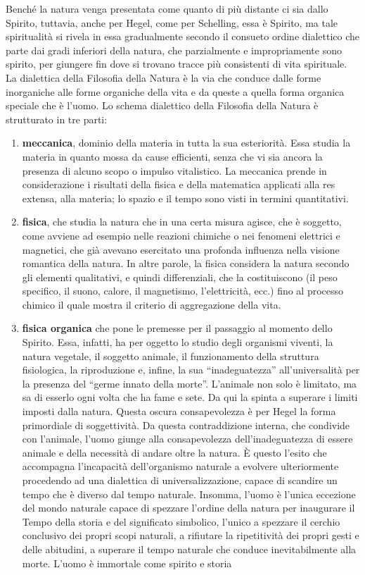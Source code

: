 \documentclass[a4paper,12pt,oneside,openany]{book}%
\begin{document}
Benché la natura venga presentata come quanto di più distante ci sia dallo Spirito, tuttavia, anche per Hegel, come per Schelling, essa è Spirito, ma tale spiritualità si rivela in essa gradualmente secondo il consueto ordine dialettico che parte dai gradi inferiori della natura, che parzialmente e impropriamente sono spirito, per giungere fin dove si trovano tracce più consistenti di vita spirituale. La dialettica della Filosofia della Natura è la via che conduce dalle forme inorganiche alle forme organiche della vita e da queste a quella forma organica speciale che è l’uomo. Lo schema dialettico della Filosofia della Natura è strutturato in tre parti:

\begin{enumerate}
	\item \textbf{meccanica}, dominio della materia in tutta la sua esteriorità. Essa studia la materia in quanto mossa da cause efficienti, senza che vi sia ancora la presenza di alcuno scopo o impulso vitalistico. La meccanica prende in considerazione i risultati della fisica e della matematica applicati alla res extensa, alla materia; lo spazio e il tempo sono visti in termini quantitativi.
	\item  \textbf{fisica}, che studia la natura che in una certa misura agisce, che è soggetto, come avviene ad esempio nelle reazioni chimiche o nei fenomeni elettrici e magnetici, che già avevano esercitato una profonda influenza nella visione romantica della natura. In altre parole, la fisica considera la natura secondo gli elementi qualitativi, e quindi differenziali, che la costituiscono (il peso specifico, il suono, calore, il magnetismo, l’elettricità, ecc.) fino al processo chimico il quale mostra il criterio di aggregazione della vita.
	\item \textbf{fisica organica} che pone le premesse per il passaggio al momento dello Spirito. Essa, infatti, ha per oggetto lo studio degli organismi viventi,  la natura vegetale, il soggetto animale, il funzionamento della struttura fisiologica, la riproduzione e, infine, la sua “inadeguatezza” all’universalità per la presenza del “germe innato della morte”. L’animale non solo è limitato, ma sa di esserlo ogni volta che ha fame e sete. Da qui la spinta a superare i limiti imposti dalla natura. Questa oscura consapevolezza è per Hegel la forma primordiale di soggettività. Da questa contraddizione interna, che condivide con l’animale, l’uomo giunge alla consapevolezza dell’inadeguatezza di essere animale e della necessità di andare oltre la natura. È questo l’esito che accompagna l’incapacità dell’organismo naturale a evolvere ulteriormente procedendo ad una dialettica di universalizzazione, capace di scandire un tempo che è diverso dal tempo naturale. Insomma, l’uomo è l’unica eccezione del mondo naturale capace di spezzare l’ordine della natura per inaugurare il Tempo della storia e del significato simbolico, l’unico a spezzare il cerchio conclusivo dei propri scopi naturali, a rifiutare la ripetitività dei propri gesti e delle abitudini, a superare il tempo naturale che conduce inevitabilmente alla morte. L’uomo è immortale come spirito e storia
\end{enumerate}
	
\end{document}
